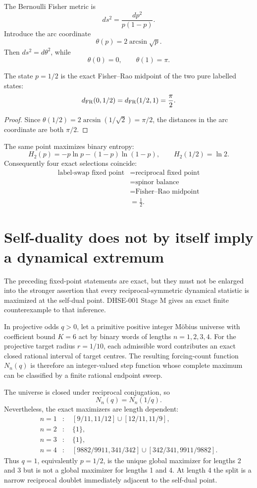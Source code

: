 The Bernoulli Fisher metric is
\[
 ds^2=\frac{dp^2}{p(1-p)}.
\]
Introduce the arc coordinate
\[
 \theta(p)=2\arcsin\sqrt p.
\]
Then $ds^2=d\theta^2$, while
\[
 \theta(0)=0,
 \qquad
 \theta(1)=\pi.
\]

\begin{theorem}
\label{thm:fisher-half-midpoint}
The state $p=1/2$ is the exact Fisher--Rao midpoint of the two pure labelled
states:
\[
 d_{\rm FR}(0,1/2)=d_{\rm FR}(1/2,1)=\frac\pi2.
\]
\end{theorem}

\begin{proof}
Since $\theta(1/2)=2\arcsin(1/\sqrt2)=\pi/2$, the distances in the arc
coordinate are both $\pi/2$.
\end{proof}

The same point maximizes binary entropy:
\[
 H_2(p)=-p\ln p-(1-p)\ln(1-p),
 \qquad
 H_2(1/2)=\ln2.
\]
Consequently four exact selections coincide:
\[
\begin{aligned}
 \text{label-swap fixed point}
 &=\text{reciprocal fixed point}\\
 &=\text{spinor balance}\\
 &=\text{Fisher--Rao midpoint}\\
 &=\frac12.
\end{aligned}
\]

\section{Self-duality does not by itself imply a dynamical extremum}
\label{sec:half-self-dual-not-maximum}

The preceding fixed-point statements are exact, but they must not be enlarged
into the stronger assertion that every reciprocal-symmetric dynamical statistic
is maximized at the self-dual point. DHSE-001 Stage M gives an exact finite
counterexample to that inference.

In projective odds $q>0$, let a primitive positive integer M\"obius universe
with coefficient bound $K=6$ act by binary words of lengths $n=1,2,3,4$. For
the projective target radius $r=1/10$, each admissible word contributes an exact
closed rational interval of target centres. The resulting forcing-count
function $N_n(q)$ is therefore an integer-valued step function whose complete
maximum can be classified by a finite rational endpoint sweep.

The universe is closed under reciprocal conjugation, so
\[
 N_n(q)=N_n(1/q).
\]
Nevertheless, the exact maximizers are length dependent:
\[
\begin{aligned}
 n=1 &: \quad [9/11,11/12]\cup[12/11,11/9],\\
 n=2 &: \quad \{1\},\\
 n=3 &: \quad \{1\},\\
 n=4 &: \quad [9882/9911,341/342]\cup[342/341,9911/9882].
\end{aligned}
\]
Thus $q=1$, equivalently $p=1/2$, is the unique global maximizer for lengths 2
and 3 but is not a global maximizer for lengths 1 and 4. At length 4 the split
is a narrow reciprocal doublet immediately adjacent to the self-dual point.

